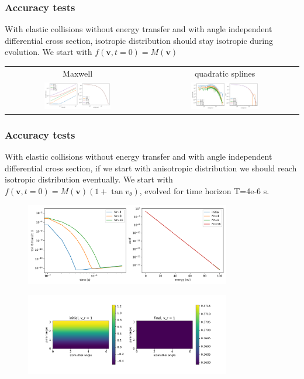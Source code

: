 \documentclass[mathserif, aspectratio=169]{beamer}
\newcommand{\vect}[1]{\boldsymbol{#1}}
\begin{document}
\begin{frame}
	\frametitle{Accuracy tests}
	With elastic collisions without energy transfer and with angle independent differential cross section, isotropic distribution should stay isotropic during evolution. We start with $f(\vect{v},t=0) = M(\vect{v})$
	
	\begin{table}
		\centering
		\begin{tabular}{cc}
			Maxwell &   quadratic splines\\
			\includegraphics[width=0.48\textwidth]{figures/m_no_e_loss_1ev_1e-6.png} & 
			\includegraphics[width=0.48\textwidth]{figures/b_sp2_no_e_loss_1ev_1e-6.png} 
		\end{tabular}
	\end{table}
\end{frame}

\begin{frame}
	\frametitle{Accuracy tests}
	With elastic collisions without energy transfer and with angle independent differential cross section, if we start with anisotropic distribution we should reach isotropic distribution eventually. We start with $f(\vect{v},t=0) = M(\vect{v}) (1 + \tan v_\theta)$, evolved for time horizon T=4e-6 s.
	
	\only<+>
	{
		\begin{figure}
			\includegraphics[width=0.8\textwidth]{figures/m_no_e_loss_aiso_test_1ev_4e-6_l2.png}
		\end{figure}
	}
	\only<+>
	{
		\begin{figure}
			\includegraphics[width=0.8\textwidth]{figures/m_no_e_loss_aiso_test_1ev_4e-6_l2_const_r.png}
		\end{figure}
	}
\end{frame}
\end{document}
